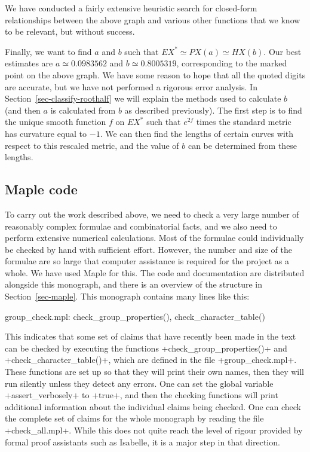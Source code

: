 \documentclass[reqno]{amsart}
\renewcommand{\:}{\colon}
\theoremstyle{definition}
\begin{document}
We have conducted a fairly extensive heuristic
search for closed-form relationships between the above graph and
various other functions that we know to be relevant, but without
success.

Finally, we want to find $a$ and $b$ such that
$EX^*\simeq PX(a)\simeq HX(b)$.  Our best estimates are
$a\simeq 0.0983562$ and $b\simeq 0.8005319$, corresponding to the
marked point on the above graph.  We have some reason to hope that all
the quoted digits are accurate, but we have not performed a rigorous
error analysis.  In Section~\ref{sec-classify-roothalf} we will
explain the methods used to calculate $b$ (and then $a$ is calculated
from $b$ as described previously).  The first step is to find the
unique smooth function $f$ on $EX^*$ such that $e^{2f}$ times the
standard metric has curvature equal to $-1$.  We can then find the
lengths of certain curves with respect to this rescaled metric, and
the value of $b$ can be determined from these lengths.

\subsection{Maple code}

To carry out the work described above, we need to check a very large
number of reasonably complex formulae and combinatorial facts, and we
also need to perform extensive numerical calculations.  Most of the
formulae could individually be checked by hand with sufficient effort.
However, the number and size of the formulae are so large that
computer assistance is required for the project as a whole.  We have
used Maple for this.  The code and documentation are distributed
alongside this monograph, and there is an overview of the structure in
Section~\ref{sec-maple}.  This monograph contains many lines like
this:
\begin{checks}
 group_check.mpl: check_group_properties(), check_character_table()
\end{checks}
This indicates that some set of claims that have recently been made in
the text can be checked by executing the functions
\mcode+check_group_properties()+ and \mcode+check_character_table()+,
which are defined in the file \fname+group_check.mpl+.  These functions
are set up so that they will print their own names, then they will run
silently unless they detect any errors.  One can set the global
variable \mcode+assert_verbosely+ to \mcode+true+, and then the checking
functions will print additional information about the individual
claims being checked.  One can check the complete set of claims for
the whole monograph by reading the file \fname+check_all.mpl+.  While
this does not quite reach the level of rigour provided by formal proof
assistants such as Isabelle, it is a major step in that direction.
\end{document}
